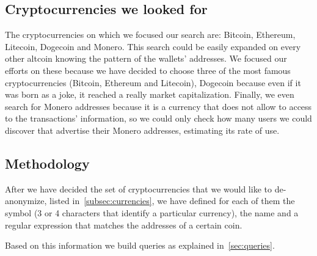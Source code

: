 \subsection{Cryptocurrencies we looked for}
\label{subsec:currencies}
The cryptocurrencies on which we focused our search are: Bitcoin, Ethereum,
Litecoin, Dogecoin and Monero. This search could be easily expanded on every
other altcoin knowing the pattern of the wallets' addresses. We focused our
efforts on these because we have decided to choose three of the most famous
cryptocurrencies (Bitcoin, Ethereum and Litecoin), Dogecoin because even if
it was born as a joke, it reached a really market capitalization. Finally, we
even search for Monero addresses because it is a currency that does not allow to
access to the transactions' information, so we could only check how many users
we could discover that advertise their Monero addresses, estimating its rate of
use.

\subsection{Methodology}
\label{sec:methodology}
After we have decided the set of cryptocurrencies that we would like to
de-anonymize, listed in~\autoref{subsec:currencies}, we have defined for
each of them the symbol (3 or 4 characters that identify a particular
currency), the name and a regular expression that matches the addresses of a
certain coin.

Based on this information we build queries as explained
in~\autoref{sec:queries}.
